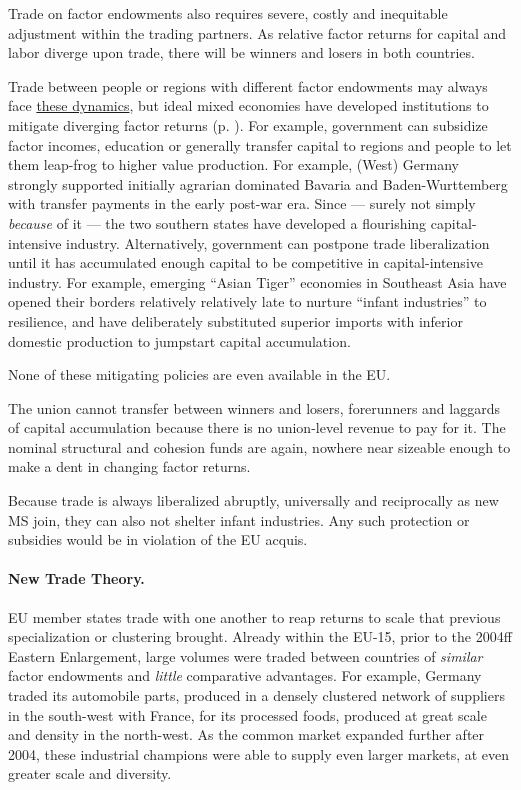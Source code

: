 \documentclass[11pt,a4paper,oneside,openright]{article}
\begin{document}
Trade on factor endowments also requires severe, costly and inequitable adjustment within the trading partners. As relative factor returns for capital and labor diverge upon trade, there will be winners and losers in both countries. 

Trade between people or regions with different factor endowments may always face \hyperref[sec:space]{these dynamics}, but ideal mixed economies have developed institutions to mitigate diverging factor returns (p. \pageref{sec:space}). For example, government can subsidize factor incomes, education or generally transfer capital to regions and people to let them leap-frog to higher value production. For example, (West) Germany strongly supported initially agrarian dominated Bavaria and Baden-Wurttemberg with transfer payments in the early post-war era. Since --- surely not simply \emph{because} of it --- the two southern states have developed a flourishing capital-intensive industry. Alternatively, government can postpone trade liberalization until it has accumulated enough capital to be competitive in capital-intensive industry. For example, emerging ``Asian Tiger'' economies in Southeast Asia have opened their borders relatively relatively late to nurture ``infant industries'' to resilience, and have deliberately substituted superior imports with inferior domestic production to jumpstart capital accumulation.

None of these mitigating policies are even available in the EU. 

The union cannot transfer between winners and losers, forerunners and laggards of capital accumulation because there is no union-level revenue to pay for it. The nominal structural and cohesion funds are again, nowhere near sizeable enough to make a dent in changing factor returns. 

Because trade is always liberalized abruptly, universally and reciprocally as new \gls{MS} join, they can also not shelter infant industries. Any such protection or subsidies would be in violation of the \gls{EU} acquis.

\paragraph{New Trade Theory.} \gls{EU} member states trade with one another to reap returns to scale that previous specialization or clustering brought. Already within the \gls{EU}-15, prior to the 2004ff Eastern Enlargement, large volumes were traded between countries of \emph{similar} factor endowments and \emph{little} comparative advantages. For example, Germany traded its automobile parts, produced in a densely clustered network of suppliers in the south-west with France, for its processed foods, produced at great scale and density in the north-west. As the common market expanded further after 2004, these industrial champions were able to supply even larger markets, at even greater scale and diversity. %
\end{document}
